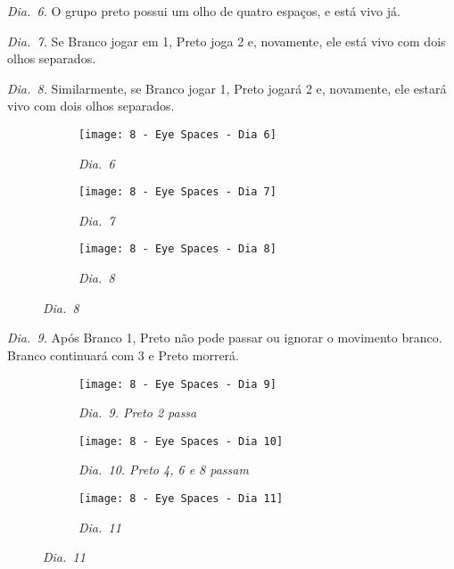 \pagebreak

\emph{Dia.\@~6.} O grupo preto possui um olho de quatro espaços, e está vivo já.

\emph{Dia.\@~7.} Se Branco jogar em 1, Preto joga 2 e, novamente, ele está vivo com dois olhos separados.

\emph{Dia.\@~8.} Similarmente, se Branco jogar 1, Preto jogará 2 e, novamente, ele estará vivo com dois olhos separados.

\begin{figure}[h!]
    \centering
    \begin{subfigure}[t]{.31\textwidth}
        \texttt{[image: 8 - Eye Spaces - Dia 6]}
        \captionsetup{justification=centering}
        \caption*{\emph{Dia.\@~6}}
    \end{subfigure}
    \hfill
    \begin{subfigure}[t]{.31\textwidth}
        \texttt{[image: 8 - Eye Spaces - Dia 7]}
        \captionsetup{justification=centering}
        \caption*{\emph{Dia.\@~7}}
    \end{subfigure}
    \hfill
    \begin{subfigure}[t]{.31\textwidth}
        \texttt{[image: 8 - Eye Spaces - Dia 8]}
        \captionsetup{justification=centering}
        \caption*{\emph{Dia.\@~8}}
    \end{subfigure}
\end{figure}

\pagebreak

\emph{Dia.\@~9.} Após Branco 1, Preto não pode passar ou ignorar o movimento branco. Branco continuará com 3 e Preto morrerá.

\begin{figure}[h!]
    \centering
    \begin{subfigure}[t]{.31\textwidth}
        \texttt{[image: 8 - Eye Spaces - Dia 9]}
        \captionsetup{justification=centering}
        \caption*{\emph{Dia.\@~9. Preto 2 passa}}
    \end{subfigure}
    \hfill
    \begin{subfigure}[t]{.31\textwidth}
        \texttt{[image: 8 - Eye Spaces - Dia 10]}
        \caption*{\emph{Dia.\@~10. Preto 4, 6 e 8 passam}}
    \end{subfigure}
    \hfill
    \begin{subfigure}[t]{.31\textwidth}
        \texttt{[image: 8 - Eye Spaces - Dia 11]}
        \captionsetup{justification=centering}
        \caption*{\emph{Dia.\@~11}}
    \end{subfigure}
\end{figure}

